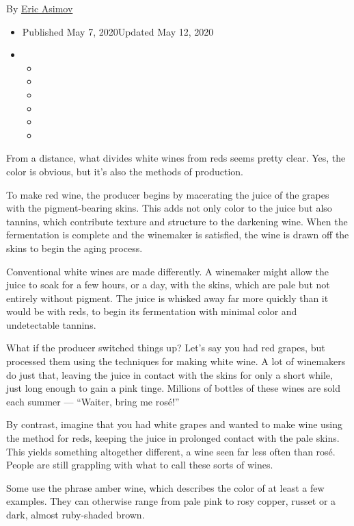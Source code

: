 By \href{https://www.nytimes3xbfgragh.onion/by/eric-asimov}{Eric Asimov}

\begin{itemize}
\item
  Published May 7, 2020Updated May 12, 2020
\item
  \begin{itemize}
  \item
  \item
  \item
  \item
  \item
  \item
  \end{itemize}
\end{itemize}

From a distance, what divides white wines from reds seems pretty clear.
Yes, the color is obvious, but it's also the methods of production.

To make red wine, the producer begins by macerating the juice of the
grapes with the pigment-bearing skins. This adds not only color to the
juice but also tannins, which contribute texture and structure to the
darkening wine. When the fermentation is complete and the winemaker is
satisfied, the wine is drawn off the skins to begin the aging process.

Conventional white wines are made differently. A winemaker might allow
the juice to soak for a few hours, or a day, with the skins, which are
pale but not entirely without pigment. The juice is whisked away far
more quickly than it would be with reds, to begin its fermentation with
minimal color and undetectable tannins.

What if the producer switched things up? Let's say you had red grapes,
but processed them using the techniques for making white wine. A lot of
winemakers do just that, leaving the juice in contact with the skins for
only a short while, just long enough to gain a pink tinge. Millions of
bottles of these wines are sold each summer --- ``Waiter, bring me
rosé!''

By contrast, imagine that you had white grapes and wanted to make wine
using the method for reds, keeping the juice in prolonged contact with
the pale skins. This yields something altogether different, a wine seen
far less often than rosé. People are still grappling with what to call
these sorts of wines.

Some use the phrase amber wine, which describes the color of at least a
few examples. They can otherwise range from pale pink to rosy copper,
russet or a dark, almost ruby-shaded brown.

